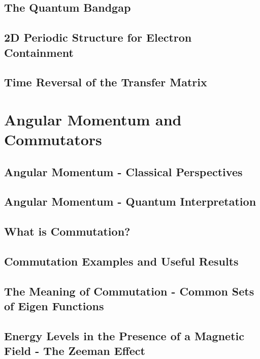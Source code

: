 \documentclass[colorlinks,11pt,a4paper,normalphoto,withhyper,ragged2e]{altareport}
\begin{document}
	
	\subsection{The Quantum Bandgap}
	
	
	\subsection{2D Periodic Structure for Electron Containment}
	
	
	\subsection{Time Reversal of the Transfer Matrix}
	
	
	\pagebreak
	
	
	
	
\section{Angular Momentum and Commutators}
	
	\subsection{Angular Momentum - Classical Perspectives}
	
	
	\subsection{Angular Momentum - Quantum Interpretation}
	
	
	\subsection{What is Commutation?}
	
	
	\subsection{Commutation Examples and Useful Results}
	
	
	\subsection{The Meaning of Commutation - Common Sets of Eigen Functions}
	
	
	\subsection{Energy Levels in the Presence of a Magnetic Field - The Zeeman Effect}
	
\end{document}
